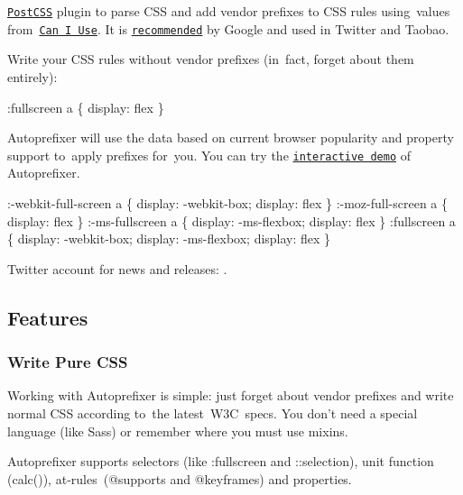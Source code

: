 

\href{https://github.com/postcss/postcss}{\tt Post\+C\+SS} plugin to parse C\+SS and add vendor prefixes to C\+SS rules using values from \href{http://caniuse.com/}{\tt Can I Use}. It is \href{https://developers.google.com/web/tools/setup/setup-buildtools#dont_trip_up_with_vendor_prefixes}{\tt recommended} by Google and used in Twitter and Taobao.

Write your C\+SS rules without vendor prefixes (in fact, forget about them entirely)\+:


\begin{DoxyCode}
:fullscreen a \{
    display: flex
\}
\end{DoxyCode}


Autoprefixer will use the data based on current browser popularity and property support to apply prefixes for you. You can try the \href{http://autoprefixer.github.io/}{\tt interactive demo} of Autoprefixer.


\begin{DoxyCode}
:-webkit-full-screen a \{
    display: -webkit-box;
    display: flex
\}
:-moz-full-screen a \{
    display: flex
\}
:-ms-fullscreen a \{
    display: -ms-flexbox;
    display: flex
\}
:fullscreen a \{
    display: -webkit-box;
    display: -ms-flexbox;
    display: flex
\}
\end{DoxyCode}


Twitter account for news and releases\+: \href{https://twitter.com/autoprefixer}{\tt }.

\href{https://evilmartians.com/?utm_source=autoprefixer}{\tt }

\subsection*{Features}

\subsubsection*{Write Pure C\+SS}

Working with Autoprefixer is simple\+: just forget about vendor prefixes and write normal C\+SS according to the latest \+W3\+C specs. You don’t need a special language (like Sass) or remember where you must use mixins.

Autoprefixer supports selectors (like {\ttfamily \+:fullscreen} and {\ttfamily \+::selection}), unit function ({\ttfamily calc()}), at‑rules ({\ttfamily @supports} and {\ttfamily @keyframes}) and properties.

